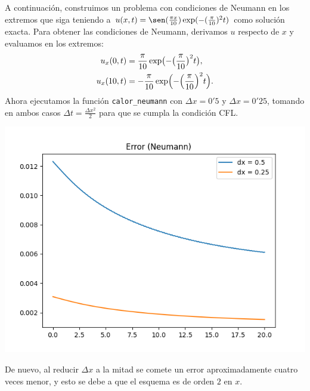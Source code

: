 \documentclass[a4paper, 12pt, oneside]{report}
\begin{document}
A continuación, construimos un problema con condiciones de Neumann en los extremos que siga teniendo a $u(x,t) = \sen(\frac{\pi x}{10})\exp(-(\frac{\pi}{10})^2t)$ como solución exacta. Para obtener las condiciones de Neumann, derivamos $u$ respecto de $x$ y evaluamos en los extremos: 
\[\begin{aligned}
u_x(0,t) &= \frac{\pi}{10}\exp\bigl(-\bigl(\frac{\pi}{10}\bigr)^2t\bigr),\\
u_x(10,t) &= -\frac{\pi}{10}\exp\Bigl(-\Bigl(\frac{\pi}{10}\Bigr)^2t\Bigr).
\end{aligned}
\]
Ahora ejecutamos la función \texttt{calor\_neumann} con $\Delta x = 0'5$ y $\Delta x = 0'25$, tomando en ambos casos $\Delta t = \frac{\Delta x^2}{2}$ para que se cumpla la condición CFL.
\begin{center}
    \includegraphics[scale = 0.8]{./images/Figure_4.png}
\end{center}
De nuevo, al reducir $\Delta x$ a la mitad se comete un error aproximadamente cuatro veces menor, y esto se debe a que el esquema es de orden $2$ en $x$.
\end{document}
